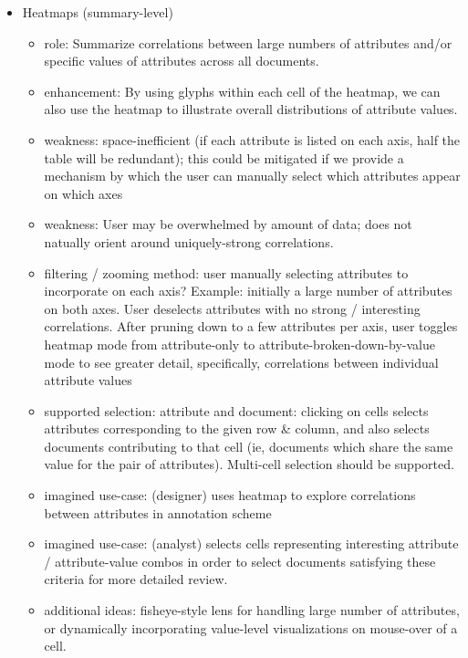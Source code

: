 \documentclass[11pt,letterpaper]{article}
\begin{document}
\begin{itemize}

\item Heatmaps (summary-level)
\begin{itemize}
\item role: Summarize correlations between large numbers of attributes and/or specific values of attributes across all documents.
\item enhancement: By using glyphs within each cell of the heatmap, we can also use the heatmap to illustrate overall distributions of attribute values.
\item weakness: space-inefficient (if each attribute is listed on each axis, half the table will be redundant); this could be mitigated if we provide a mechanism by which the user can manually select which attributes appear on which axes
\item weakness: User may be overwhelmed by amount of data; does not natually orient around uniquely-strong correlations.
\item filtering / zooming method: user manually selecting attributes to incorporate on each axis? Example: initially a large number of attributes on both axes. User deselects attributes with no strong / interesting correlations. After pruning down to a few attributes per axis, user toggles heatmap mode from attribute-only to attribute-broken-down-by-value mode to see greater detail, specifically, correlations between individual attribute values
\item supported selection: attribute and document: clicking on cells selects attributes corresponding to the given row \& column, and also selects documents contributing to that cell (ie, documents which share the same value for the pair of attributes). Multi-cell selection should be supported.
\item imagined use-case: (designer) uses heatmap to explore correlations between attributes in annotation scheme
\item imagined use-case: (analyst) selects cells representing interesting attribute / attribute-value combos in order to select documents satisfying these criteria for more detailed review.
\item additional ideas: fisheye-style lens for handling large number of attributes, or dynamically incorporating value-level visualizations on mouse-over of a cell.
\end{itemize}


\end{itemize}
\end{document}
